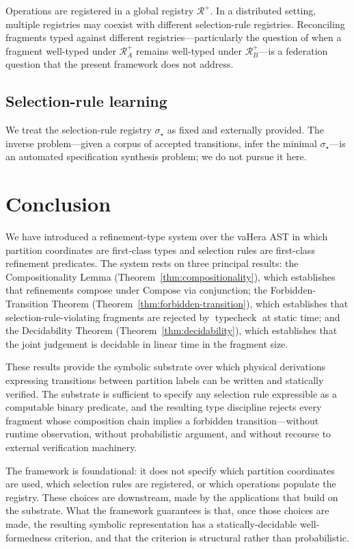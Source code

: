 \documentclass[twocolumn,11pt,a4paper]{article}
\DeclareMathOperator{\typecheck}{typecheck}
\newcommand{\Reg}{\mathcal{R}}
\newcommand{\Sel}{\sigma}
\begin{document}
Operations are registered in a global registry $\Reg^+$. In a distributed setting, multiple registries may coexist with different selection-rule registries. Reconciling fragments typed against different registries---particularly the question of when a fragment well-typed under $\Reg^+_A$ remains well-typed under $\Reg^+_B$---is a federation question that the present framework does not address.

\subsection{Selection-rule learning}

We treat the selection-rule registry $\Sel_\star$ as fixed and externally provided. The inverse problem---given a corpus of accepted transitions, infer the minimal $\Sel_\star$---is an automated specification synthesis problem; we do not pursue it here.

\section{Conclusion}
\label{sec:conclusion}

We have introduced a refinement-type system over the vaHera AST in which partition coordinates are first-class types and selection rules are first-class refinement predicates. The system rests on three principal results: the Compositionality Lemma (Theorem~\ref{thm:compositionality}), which establishes that refinements compose under $\mathrm{Compose}$ via conjunction; the Forbidden-Transition Theorem (Theorem~\ref{thm:forbidden-transition}), which establishes that selection-rule-violating fragments are rejected by $\typecheck$ at static time; and the Decidability Theorem (Theorem~\ref{thm:decidability}), which establishes that the joint judgement is decidable in linear time in the fragment size.

These results provide the symbolic substrate over which physical derivations expressing transitions between partition labels can be written and statically verified. The substrate is sufficient to specify any selection rule expressible as a computable binary predicate, and the resulting type discipline rejects every fragment whose composition chain implies a forbidden transition---without runtime observation, without probabilistic argument, and without recourse to external verification machinery.

The framework is foundational: it does not specify which partition coordinates are used, which selection rules are registered, or which operations populate the registry. These choices are downstream, made by the applications that build on the substrate. What the framework guarantees is that, once those choices are made, the resulting symbolic representation has a statically-decidable well-formedness criterion, and that the criterion is structural rather than probabilistic.
\end{document}
